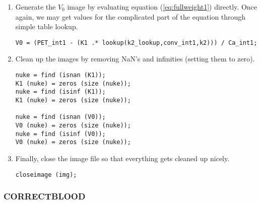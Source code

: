 \begin{enumerate}
\item Generate the $V_0$ image by evaluating equation
(\ref{eq:fullweight1}) directly.  Once again, we may get values for
the complicated part of the equation through simple table lookup.
\begin{verbatim}
V0 = (PET_int1 - (K1 .* lookup(k2_lookup,conv_int1,k2))) / Ca_int1;
\end{verbatim}

\item Clean up the images by removing NaN's and infinities (setting
them to zero).
\begin{verbatim}
nuke = find (isnan (K1));
K1 (nuke) = zeros (size (nuke));
nuke = find (isinf (K1));
K1 (nuke) = zeros (size (nuke));

nuke = find (isnan (V0));
V0 (nuke) = zeros (size (nuke));
nuke = find (isinf (V0));
V0 (nuke) = zeros (size (nuke));
\end{verbatim}

\item Finally, close the image file so that everything gets cleaned
up nicely.
\begin{verbatim}
closeimage (img);
\end{verbatim}

\end{enumerate}


\subsubsection{CORRECTBLOOD}

